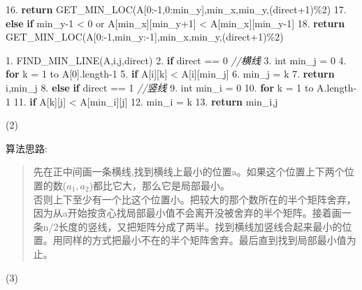 \documentclass[
]{ctexart}
\newenvironment{Shaded}{}{}
\newcommand{\CommentTok}[1]{\textcolor[rgb]{0.38,0.63,0.69}{\textit{#1}}}
\newcommand{\ControlFlowTok}[1]{\textcolor[rgb]{0.00,0.44,0.13}{\textbf{#1}}}
\newcommand{\DataTypeTok}[1]{\textcolor[rgb]{0.56,0.13,0.00}{#1}}
\newcommand{\DecValTok}[1]{\textcolor[rgb]{0.25,0.63,0.44}{#1}}
\newcommand{\FloatTok}[1]{\textcolor[rgb]{0.25,0.63,0.44}{#1}}
\newcommand{\NormalTok}[1]{#1}
\begin{document}
\begin{Shaded}
\begin{Highlighting}[]
\FloatTok{16.}			\ControlFlowTok{return}\NormalTok{ GET\_MIN\_LOC(A[}\DecValTok{0}\NormalTok{:{-}}\DecValTok{1}\NormalTok{,}\DecValTok{0}\NormalTok{:min\_y],min\_x,min\_y,(direct+}\DecValTok{1}\NormalTok{)\%}\DecValTok{2}\NormalTok{)}
\FloatTok{17.}		\ControlFlowTok{else} \ControlFlowTok{if}\NormalTok{ min\_y{-}}\DecValTok{1}\NormalTok{ \textless{} }\DecValTok{0}\NormalTok{ or A[min\_x][min\_y+}\DecValTok{1}\NormalTok{] \textless{} A[min\_x][min\_y{-}}\DecValTok{1}\NormalTok{]}
\FloatTok{18.}			\ControlFlowTok{return}\NormalTok{ GET\_MIN\_LOC(A[}\DecValTok{0}\NormalTok{:{-}}\DecValTok{1}\NormalTok{,min\_y:{-}}\DecValTok{1}\NormalTok{],min\_x,min\_y,(direct+}\DecValTok{1}\NormalTok{)\%}\DecValTok{2}\NormalTok{)}

\FloatTok{1.}\NormalTok{ FIND\_MIN\_LINE(A,i,j,direct)}
\FloatTok{2.} 	\ControlFlowTok{if}\NormalTok{ direct == }\DecValTok{0} \CommentTok{//横线}
\FloatTok{3.} 		\DataTypeTok{int}\NormalTok{ min\_j = }\DecValTok{0}
\FloatTok{4.} 		\ControlFlowTok{for}\NormalTok{ k = }\DecValTok{1}\NormalTok{ to A[}\DecValTok{0}\NormalTok{].length{-}}\DecValTok{1}
\FloatTok{5.} 			\ControlFlowTok{if}\NormalTok{ A[i][k] \textless{} A[i][min\_j]}
\FloatTok{6.}\NormalTok{ 				min\_j = k}
\FloatTok{7.} 		\ControlFlowTok{return}\NormalTok{ i,min\_j}
\FloatTok{8.} 	\ControlFlowTok{else} \ControlFlowTok{if}\NormalTok{ direct == }\DecValTok{1} \CommentTok{//竖线}
\FloatTok{9.} 		\DataTypeTok{int}\NormalTok{ min\_i = }\DecValTok{0}
\FloatTok{10.}		\ControlFlowTok{for}\NormalTok{ k = }\DecValTok{1}\NormalTok{ to A.length{-}}\DecValTok{1}
\FloatTok{11.}			\ControlFlowTok{if}\NormalTok{ A[k][j] \textless{} A[min\_i][j]}
\FloatTok{12.}\NormalTok{				min\_i = k}
\FloatTok{13.}		\ControlFlowTok{return}\NormalTok{ min\_i,j}
\end{Highlighting}
\end{Shaded}

(2)

算法思路:

\begin{quote}
先在正中间画一条横线,找到横线上最小的位置a。如果这个位置上下两个位置的数(\(a_1,a_2\))都比它大，那么它是局部最小。\\
否则上下至少有一个比这个位置小。把较大的那个数所在的半个矩阵舍弃，因为从a开始按贪心找局部最小值不会离开没被舍弃的半个矩阵。接着画一条n/2长度的竖线，又把矩阵分成了两半。找到横线加竖线合起来最小的位置。用同样的方式把最小不在的半个矩阵舍弃。最后直到找到局部最小值为止。
\end{quote}

(3)
\end{document}
